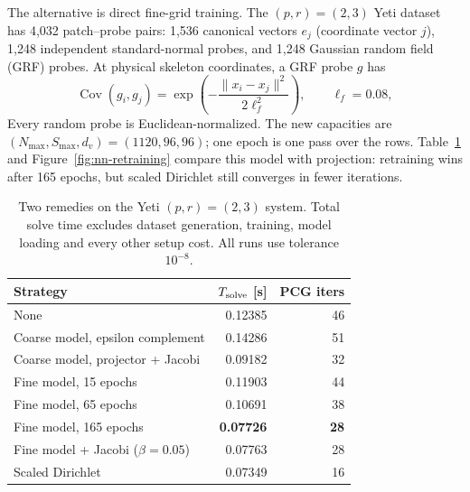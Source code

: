 \documentclass{article}
\newcommand{\dv}{d_v}                             %
\theoremstyle{plain}
\numberwithin{equation}{section}
\begin{document}
The alternative is direct fine-grid training.  The $(p,r)=(2,3)$ Yeti dataset
has 4,032 patch--probe pairs: 1,536 canonical vectors $e_j$ (coordinate vector
$j$), 1,248 independent standard-normal probes, and 1,248 Gaussian random
field (GRF) probes.  At physical skeleton coordinates, a GRF probe $g$ has
\begin{equation}
    \operatorname{Cov}(g_i,g_j)
    =\exp\!\left(-\frac{\|x_i-x_j\|^2}{2\ell_f^2}\right),
    \qquad \ell_f=0.08,
    \label{eq:nn-fine-grf}
\end{equation}
Every random probe is Euclidean-normalized.  The new capacities are
$(N_{\max},S_{\max},\dv)=(1120,96,96)$; one epoch is one pass over the rows.
Table~\ref{tab:nn-fine-retraining} and Figure~\ref{fig:nn-retraining} compare
this model with projection: retraining wins after 165 epochs, but scaled
Dirichlet still converges in fewer iterations.

\begin{table}[ht]
    \centering
    \caption{Two remedies on the Yeti $(p,r)=(2,3)$ system.  Total solve time
        excludes dataset generation, training, model loading and every other setup
        cost.  All runs use tolerance $10^{-8}$.}
    \label{tab:nn-fine-retraining}
    \begin{tabular}{lrr}
        \toprule
        Strategy                           & $T_{\rm solve}$ [s] & PCG iters   \\
        \midrule
        None                               & 0.12385             & 46          \\
        Coarse model, epsilon complement   & 0.14286             & 51          \\
        Coarse model, projector + Jacobi   & 0.09182             & 32          \\
        Fine model, 15 epochs              & 0.11903             & 44          \\
        Fine model, 65 epochs              & 0.10691             & 38          \\
        Fine model, 165 epochs             & \textbf{0.07726}    & \textbf{28} \\
        Fine model + Jacobi ($\beta=0.05$) & 0.07763             & 28          \\
        Scaled Dirichlet                   & 0.07349             & 16          \\
        \bottomrule
    \end{tabular}
\end{table}
\end{document}
